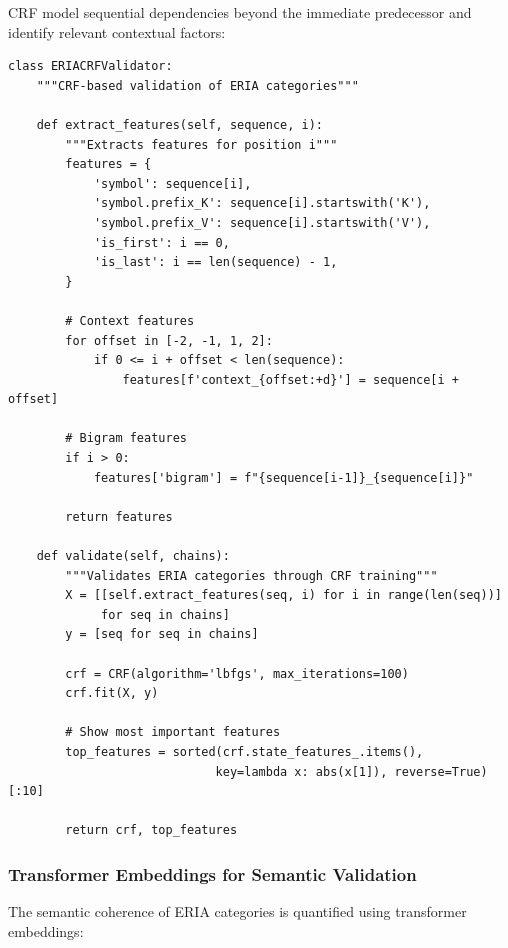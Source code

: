 \documentclass[12pt,a4paper]{article}
\begin{document}
CRF model sequential dependencies beyond the immediate predecessor and identify relevant contextual factors:

\begin{lstlisting}[caption=CRF validation in ERIA]
class ERIACRFValidator:
    """CRF-based validation of ERIA categories"""
    
    def extract_features(self, sequence, i):
        """Extracts features for position i"""
        features = {
            'symbol': sequence[i],
            'symbol.prefix_K': sequence[i].startswith('K'),
            'symbol.prefix_V': sequence[i].startswith('V'),
            'is_first': i == 0,
            'is_last': i == len(sequence) - 1,
        }
        
        # Context features
        for offset in [-2, -1, 1, 2]:
            if 0 <= i + offset < len(sequence):
                features[f'context_{offset:+d}'] = sequence[i + offset]
        
        # Bigram features
        if i > 0:
            features['bigram'] = f"{sequence[i-1]}_{sequence[i]}"
        
        return features
    
    def validate(self, chains):
        """Validates ERIA categories through CRF training"""
        X = [[self.extract_features(seq, i) for i in range(len(seq))] 
             for seq in chains]
        y = [seq for seq in chains]
        
        crf = CRF(algorithm='lbfgs', max_iterations=100)
        crf.fit(X, y)
        
        # Show most important features
        top_features = sorted(crf.state_features_.items(), 
                             key=lambda x: abs(x[1]), reverse=True)[:10]
        
        return crf, top_features
\end{lstlisting}

\subsubsection{Transformer Embeddings for Semantic Validation}

The semantic coherence of ERIA categories is quantified using transformer embeddings:
\end{document}
